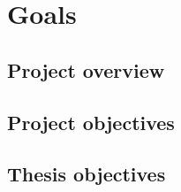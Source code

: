 \chapter{Goals}
\label{chap:goal}

\section{Project overview}

\section{Project objectives}

\section{Thesis objectives}
